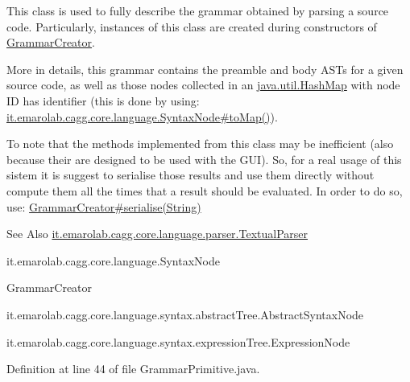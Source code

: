 This class is used to fully describe the grammar obtained by parsing a source code. Particularly, instances of this class are created during constructors of \hyperlink{}{Grammar\-Creator}.\par


More in details, this grammar contains the preamble and body A\-S\-Ts for a given source code, as well as those nodes collected in an \hyperlink{}{java.\-util.\-Hash\-Map} with node I\-D has identifier (this is done by using\-: \hyperlink{}{it.\-emarolab.\-cagg.\-core.\-language.\-Syntax\-Node\#to\-Map()}).\par


To note that the methods implemented from this class may be inefficient (also because their are designed to be used with the G\-U\-I). So, for a real usage of this sistem it is suggest to serialise those results and use them directly without compute them all the times that a result should be evaluated. In order to do so, use\-: \hyperlink{}{Grammar\-Creator\#serialise(\-String)} 

\begin{DoxySeeAlso}{See Also}
\hyperlink{classit_1_1emarolab_1_1cagg_1_1core_1_1language_1_1parser_1_1TextualParser}{it.\-emarolab.\-cagg.\-core.\-language.\-parser.\-Textual\-Parser} 

it.\-emarolab.\-cagg.\-core.\-language.\-Syntax\-Node 

Grammar\-Creator 

it.\-emarolab.\-cagg.\-core.\-language.\-syntax.\-abstract\-Tree.\-Abstract\-Syntax\-Node 

it.\-emarolab.\-cagg.\-core.\-language.\-syntax.\-expression\-Tree.\-Expression\-Node 
\end{DoxySeeAlso}


Definition at line 44 of file Grammar\-Primitive.\-java.



